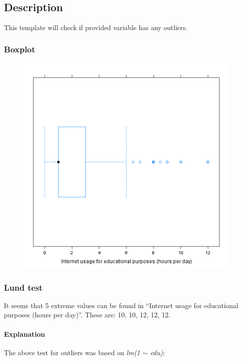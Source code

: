 \documentclass{article}
\makeatletter
\def\maxwidth{\ifdim\Gin@nat@width>\linewidth\linewidth
\else\Gin@nat@width\fi}
\let\Oldincludegraphics\includegraphics
\renewcommand{\includegraphics}[1]{\Oldincludegraphics[width=\maxwidth]{#1}}
\makeatother
\begin{document}
\subsection{Description}

This template will check if provided variable has any outliers.

\subsubsection{Boxplot}

\begin{figure}[htbp]
\centering
\includegraphics{7e4826ae32ce6332453510e91fb95335.png}
\caption{}
\end{figure}

\subsubsection{Lund test}

It seems that 5 extreme values can be found in ``Internet usage for
educational purposes (hours per day)''. These are: 10, 10, 12, 12, 12.

\paragraph{Explanation}

The above test for outliers was based on \emph{lm(1 \ensuremath{\sim}
edu)}:
\end{document}
